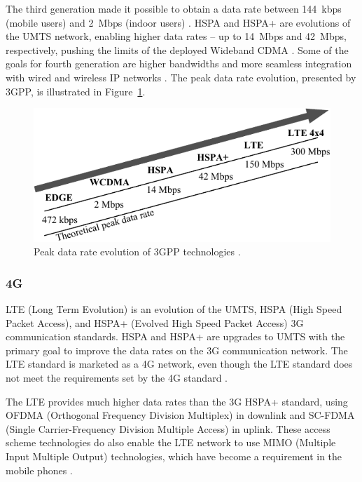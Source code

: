 The third generation made it possible to obtain a data rate between \SI{144}{kbps} (mobile users) and \SI{2}{Mbps} (indoor users) \cite{tanenbaum2012computer}. HSPA and HSPA+ are evolutions of the UMTS network, enabling higher data rates -- up to \SI{14}{Mbps} and \SI{42}{Mbps}, respectively, pushing the limits of the deployed Wideband CDMA \cite{holma2011lte}. Some of the goals for fourth generation are higher bandwidths and more seamless integration with wired and wireless IP networks \cite{tanenbaum2012computer}. The peak data rate evolution, presented by 3GPP, is illustrated in Figure~\ref{fig:3gppevo}.

\begin{figure}[htbp]
    \centering
    \includegraphics[scale=0.8]{img/analysis/3gppevo.pdf}
    \caption{Peak data rate evolution of 3GPP technologies \cite{holma2011lte}.}
    \label{fig:3gppevo}
\end{figure}


\subsubsection{4G}
LTE (Long Term Evolution) is an evolution of the UMTS, HSPA (High Speed Packet Access), and HSPA+ (Evolved High Speed Packet Access) 3G communication standards. HSPA and HSPA+ are upgrades to UMTS with the primary goal to improve the data rates on the 3G communication network. The LTE standard is marketed as a 4G network, even though the LTE standard does not meet the requirements set by the 4G standard \cite{radio2015electronics}.

The LTE provides much higher data rates than the 3G HSPA+ standard, using OFDMA (Orthogonal Frequency Division Multiplex) in downlink and SC-FDMA (Single Carrier-Frequency Division Multiple Access) in uplink. These access scheme technologies do also enable the LTE network to use MIMO (Multiple Input Multiple Output) technologies, which have become a requirement in the mobile phones \cite{radio2015electronics}.

